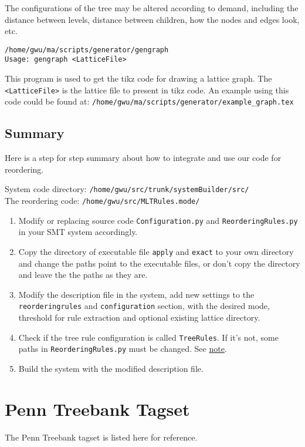 The configurations of the tree may be altered according to demand, including the distance between levels, distance between children, how the nodes and edges look, etc.

\verb|/home/gwu/ma/scripts/generator/gengraph| \\
\verb|Usage: gengraph <LatticeFile>|

This program is used to get the tikz code for drawing a lattice graph. The \verb|<LatticeFile>| is the lattice file to present in tikz code. An example using this code could be found at:
\verb|/home/gwu/ma/scripts/generator/example_graph.tex|
	
\subsection{Summary}
\label{summary}

Here is a step for step summary about how to integrate and use our code for reordering.

System code directory: \verb|/home/gwu/src/trunk/systemBuilder/src/|\\
The reordering code: \verb|/home/gwu/src/MLTRules.mode/|

\begin{enumerate}
\item Modify or replacing source code \verb|Configuration.py| and \verb|ReorderingRules.py| in your SMT system accordingly.
\item Copy the directory of executable file \verb|apply| and \verb|exact| to your own directory and change the paths point to the executable files, or don't copy the directory and leave the the paths as they are.
\item Modify the description file in the system, add new settings to the \verb|reorderingrules| and \verb|configuration| section, with the desired mode, threshold for rule extraction and optional existing lattice directory.
\item Check if the tree rule configuration is called \verb|TreeRules|. If it's not, some paths in \verb|ReorderingRules.py| must be changed. See \hyperref[note]{note}.
\item Build the system with the modified description file.
\end{enumerate}

\newpage
\section{Penn Treebank Tagset}
\label{tagset}
The Penn Treebank tagset is listed here for reference.\citep{penn, penn3}

